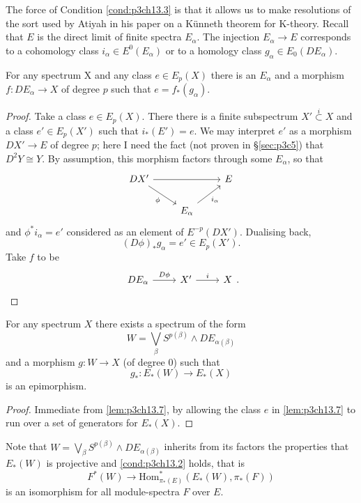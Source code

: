 \documentclass[../main]{subfiles}
\begin{document}
The force of Condition \ref{cond:p3ch13.3} is that it allows us to make resolutions of the sort used by Atiyah in his paper on a K\"{u}nneth theorem for K-theory. Recall that $E$ is the direct limit of finite spectra $E_\alpha$. The injection $E_\alpha \longrightarrow E$ corresponds to a cohomology class $i_\alpha \in E^0(E_\alpha)$ or to a homology class $g_\alpha \in E_0(DE_\alpha)$.
\begin{lemma}\label{lem:p3ch13.7}
For any spectrum X and any class $e \in E_p(X)$ there is an $E_\alpha$ and a morphism $f \colon DE_\alpha \longrightarrow X$ of degree $p$ such that $e = f_\ast(g_\alpha)$.
\end{lemma}
\begin{proof}
Take a class $e \in E_p(X)$. There there is a finite subspectrum $X' \overset{i}{\subset} X$ and a class $e' \in E_p(X')$ such that $i_\ast(E') = e$. We may interpret $e'$ as a morphism $DX' \longrightarrow E$ of degree $p$; here I need the fact (not proven in \S\ref{sec:p3c5}) that $D^2Y \cong Y$. By assumption, this morphism factors through some $E_\alpha$, so that 
\[\begin{tikzcd}
	{DX'} && E \\
	& {E_\alpha}
	\arrow["\phi"', from=1-1, to=2-2]
	\arrow["{i_\alpha}"', from=2-2, to=1-3]
	\arrow[from=1-1, to=1-3]
\end{tikzcd}\]
and $\phi^\ast i_\alpha = e'$ considered as an element of $E^{-p}(DX')$. Dualising back,
\[(D\phi)_\ast g_\alpha = e' \in E_p(X').\]
Take $f$ to be 
\[\begin{tikzcd} 
DE_\alpha & X' & {X} \arrow["D\phi", from=1-1, to=1-2]\arrow["i", from=1-2, to=1-3]
\end{tikzcd}.\]
\end{proof}
\begin{lemma}\label{lem:p3ch13.8}
For any spectrum $X$ there exists a spectrum of the form
\[W = \bigvee_{\beta}S^{p(\beta)}\wedge DE_{\alpha(\beta)}\]
and a morphism $g \colon W \longrightarrow X$ (of degree 0) such that
\[g_\ast \colon E_\ast(W) \longrightarrow E_\ast(X)\]
is an epimorphism.\end{lemma}
\begin{proof} Immediate from \ref{lem:p3ch13.7}, by allowing the class $e$ in \ref{lem:p3ch13.7} to run over a set of generators for $E_\ast(X)$.\end{proof}

Note that $W=\bigvee_{\beta}S^{p(\beta)}\wedge DE_{\alpha(\beta)}$ inherits from its factors the properties that $E_\ast(W)$ is projective and \ref{cond:p3ch13.2} holds, that is
\[F^\ast(W) \longrightarrow \text{Hom}^\ast_{\pi_\ast(E)}(E_\ast(W), \pi_\ast(F))\]
is an isomorphism for all module-spectra $F$ over $E$.
\end{document}

